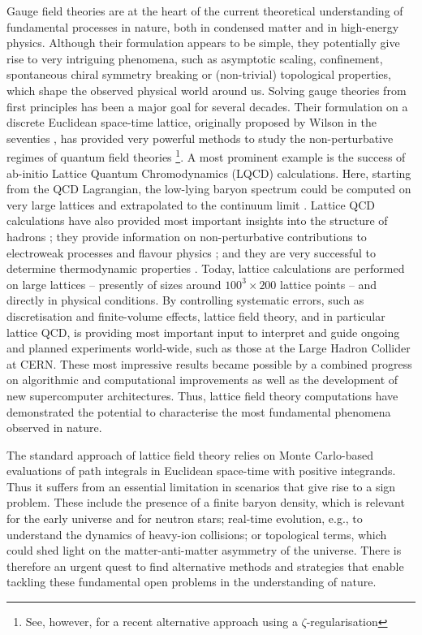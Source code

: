 \documentclass[epj,final]{svjour}
\begin{document}
Gauge field theories are at the heart of the current theoretical understanding of fundamental processes in nature, both in condensed matter and in high-energy physics. Although their formulation appears to be simple, they potentially give rise to very intriguing phenomena, such as asymptotic scaling, confinement, spontaneous chiral symmetry breaking or (non-trivial) topological properties, which shape the observed physical world around us. Solving gauge theories from first principles has been a major goal for several decades. Their formulation on a discrete Euclidean space-time lattice, originally proposed by Wilson in the seventies \cite{Wilson:1974sk}, has provided very powerful methods to study the non-perturbative regimes of quantum field theories \footnote{See, however, \cite{Hartung:2018usn} for a recent alternative approach using a $\zeta$-regularisation}. A most prominent example is the success of ab-initio Lattice Quantum Chromodynamics (LQCD) calculations. Here, starting from the QCD Lagrangian, the low-lying baryon spectrum could be computed on very large lattices and extrapolated to the continuum limit \cite{Durr:2008zz}. Lattice QCD calculations have also provided most important insights into the structure of hadrons \cite{Constantinou:2015agp,Cichy:2018mum}; they provide information on non-perturbative contributions to electroweak processes \cite{Meyer:2018til} and flavour physics \cite{Juettner:2016atf}; and they are very successful to determine thermodynamic properties \cite{Ding:2015ona}. Today, lattice calculations are performed on large lattices -- presently of sizes around $100^3\times 200$ lattice points -- and directly in physical conditions. By controlling systematic errors, such as discretisation and finite-volume effects, lattice field theory, and in particular lattice QCD, is providing most important input to interpret and guide ongoing and planned experiments world-wide, such as those at the Large Hadron Collider at CERN. These most impressive results became possible by a combined progress on algorithmic and computational improvements as well as the development of new supercomputer architectures. Thus, lattice field theory computations have demonstrated the potential to characterise the most fundamental phenomena observed in nature. 

The standard approach of lattice field theory relies on Monte Carlo-based evaluations of path integrals in Euclidean space-time with positive integrands. Thus it suffers from an essential limitation in scenarios that give rise to a sign problem. These include the presence of a finite baryon density, which is relevant for the early universe and for neutron stars; real-time evolution, e.g., to understand the dynamics of heavy-ion collisions; or topological terms, which could shed light on the matter-anti-matter asymmetry of the universe. There is therefore an urgent quest to find alternative methods and strategies that enable tackling these fundamental open problems in the understanding of nature. 
\end{document}
